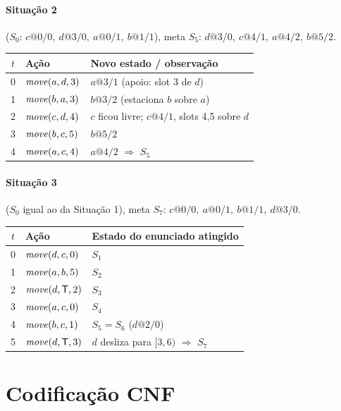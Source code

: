 \documentclass[11pt,a4paper]{article}
\newcommand{\Tm}{\mathsf{T}}
\begin{document}
\paragraph{Situação 2} ($S_0$: $c@0/0,\ d@3/0,\ a@0/1,\ b@1/1$), meta $S_5$: $d@3/0,\ c@4/1,\ a@4/2,\ b@5/2$.
\begin{center}\small\begin{tabular}{@{}clp{7.6cm}@{}}\toprule
$t$ & Ação & Novo estado / observação\\\midrule
0 & $\mathit{move}(a,d,3)$ & $a@3/1$ (apoio: slot 3 de $d$)\\
1 & $\mathit{move}(b,a,3)$ & $b@3/2$ (estaciona $b$ sobre $a$)\\
2 & $\mathit{move}(c,d,4)$ & $c$ ficou livre; $c@4/1$, slots 4,5 sobre $d$\\
3 & $\mathit{move}(b,c,5)$ & $b@5/2$\\
4 & $\mathit{move}(a,c,4)$ & $a@4/2$ $\Rightarrow$ $S_5$\\\bottomrule
\end{tabular}\end{center}

\paragraph{Situação 3} ($S_0$ igual ao da Situação 1), meta $S_7$: $c@0/0,\ a@0/1,\ b@1/1,\ d@3/0$.
\begin{center}\small\begin{tabular}{@{}clp{7.6cm}@{}}\toprule
$t$ & Ação & Estado do enunciado atingido\\\midrule
0 & $\mathit{move}(d,c,0)$ & $S_1$\\
1 & $\mathit{move}(a,b,5)$ & $S_2$\\
2 & $\mv(d,\Tm,2)$ & $S_3$\\
3 & $\mathit{move}(a,c,0)$ & $S_4$\\
4 & $\mathit{move}(b,c,1)$ & $S_5=S_6$ ($d@2/0$)\\
5 & $\mv(d,\Tm,3)$ & $d$ desliza para $[3,6)$ $\Rightarrow$ $S_7$\\\bottomrule
\end{tabular}\end{center}

\section{Codificação CNF}
\end{document}
